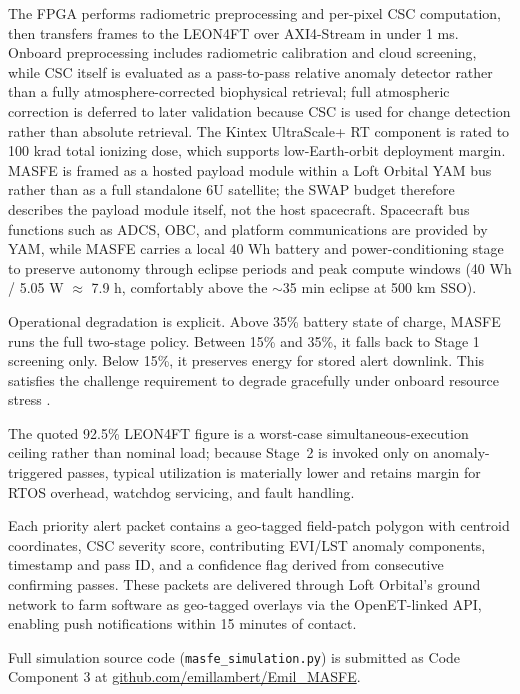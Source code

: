 The FPGA performs radiometric preprocessing and per-pixel CSC computation, then transfers frames to the LEON4FT over AXI4-Stream in under 1 ms. Onboard preprocessing includes radiometric calibration and cloud screening, while CSC itself is evaluated as a pass-to-pass relative anomaly detector rather than a fully atmosphere-corrected biophysical retrieval; full atmospheric correction is deferred to later validation because CSC is used for change detection rather than absolute retrieval. The Kintex UltraScale+ RT component is rated to 100 krad total ionizing dose, which supports low-Earth-orbit deployment margin. MASFE is framed as a hosted payload module within a Loft Orbital YAM bus rather than as a full standalone 6U satellite; the SWAP budget therefore describes the payload module itself, not the host spacecraft. Spacecraft bus functions such as ADCS, OBC, and platform communications are provided by YAM, while MASFE carries a local 40 Wh battery and power-conditioning stage to preserve autonomy through eclipse periods and peak compute windows (40 Wh / 5.05 W $\approx$ 7.9 h, comfortably above the $\sim$35 min eclipse at 500 km SSO).

Operational degradation is explicit. Above 35\% battery state of charge, MASFE runs the full two-stage policy. Between 15\% and 35\%, it falls back to Stage 1 screening only. Below 15\%, it preserves energy for stored alert downlink. This satisfies the challenge requirement to degrade gracefully under onboard resource stress \cite{nasa-challenge-brief}.

The quoted 92.5\% LEON4FT figure is a worst-case simultaneous-execution ceiling rather than nominal load; because Stage~2 is invoked only on anomaly-triggered passes, typical utilization is materially lower and retains margin for RTOS overhead, watchdog servicing, and fault handling.

Each priority alert packet contains a geo-tagged field-patch polygon with centroid coordinates, CSC severity score, contributing EVI/LST anomaly components, timestamp and pass ID, and a confidence flag derived from consecutive confirming passes. These packets are delivered through Loft Orbital's ground network to farm software as geo-tagged overlays via the OpenET-linked API, enabling push notifications within 15 minutes of contact.

Full simulation source code (\texttt{masfe\_simulation.py}) is submitted as Code Component 3 at \href{https://github.com/emillambert/Emil_MASFE}{github.com/emillambert/Emil\_MASFE}.
